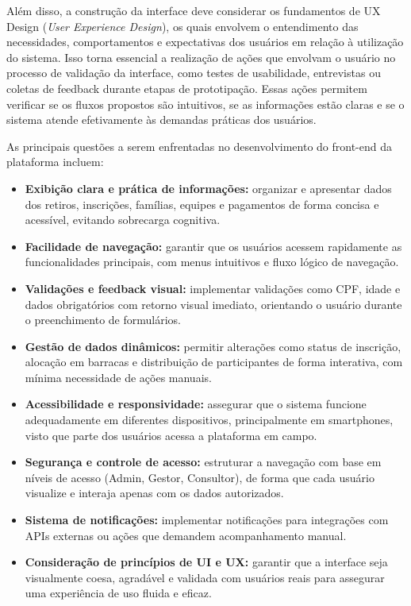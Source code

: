 Além disso, a construção da interface deve considerar os fundamentos de UX Design (\textit{User Experience Design}), os quais envolvem o entendimento das necessidades, comportamentos e expectativas dos usuários em relação à utilização do sistema. Isso torna essencial a realização de ações que envolvam o usuário no processo de validação da interface, como testes de usabilidade, entrevistas ou coletas de feedback durante etapas de prototipação. Essas ações permitem verificar se os fluxos propostos são intuitivos, se as informações estão claras e se o sistema atende efetivamente às demandas práticas dos usuários.

As principais questões a serem enfrentadas no desenvolvimento do front-end da plataforma incluem:

\begin{itemize}
  \item \textbf{Exibição clara e prática de informações:} organizar e apresentar dados dos retiros, inscrições, famílias, equipes e pagamentos de forma concisa e acessível, evitando sobrecarga cognitiva.
  
  \item \textbf{Facilidade de navegação:} garantir que os usuários acessem rapidamente as funcionalidades principais, com menus intuitivos e fluxo lógico de navegação.
  
  \item \textbf{Validações e feedback visual:} implementar validações como CPF, idade e dados obrigatórios com retorno visual imediato, orientando o usuário durante o preenchimento de formulários.
  
  \item \textbf{Gestão de dados dinâmicos:} permitir alterações como status de inscrição, alocação em barracas e distribuição de participantes de forma interativa, com mínima necessidade de ações manuais.
  
  \item \textbf{Acessibilidade e responsividade:} assegurar que o sistema funcione adequadamente em diferentes dispositivos, principalmente em smartphones, visto que parte dos usuários acessa a plataforma em campo.
  
  \item \textbf{Segurança e controle de acesso:} estruturar a navegação com base em níveis de acesso (Admin, Gestor, Consultor), de forma que cada usuário visualize e interaja apenas com os dados autorizados.
  
  \item \textbf{Sistema de notificações:} implementar notificações para integrações com APIs externas ou ações que demandem acompanhamento manual.
  
  \item \textbf{Consideração de princípios de UI e UX:} garantir que a interface seja visualmente coesa, agradável e validada com usuários reais para assegurar uma experiência de uso fluida e eficaz.
\end{itemize}

